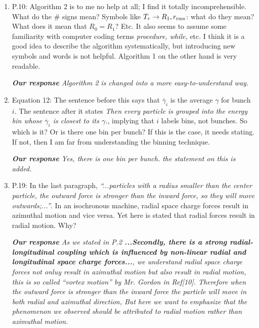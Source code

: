 \documentclass[10pt]{report}
\begin{document}
\begin{enumerate}
\item P.10: Algorithm 2 is to me no help at all; I find it totally
 incomprehensible. 
 What do the \# signs mean? Symbols like $T_r\rightarrow R_1,r_{\rm rms}$: what
 do they mean? What does it mean that $R_0=R_1$? Etc. It also seems to assume
 some familiarity with computer coding terms \textit{procedure, while,} etc. I
 think it is a good idea to describe the algorithm systematically, but
 introducing new symbols and words is not helpful. Algorithm 1 on the other hand
 is very readable.
 
 \vspace{+2mm}
 {\it {\bf Our response} Algorithm 2 is changed into a more easy-to-understand way.
 }
 \vspace{+2mm}

  \item Equation 12: The sentence before this says that $\overline{\gamma}_i$ is
 the 
 average $\gamma$ for bunch $i$. The sentence after it states \textit{Then every
 particle is grouped into the energy bin whose $\overline{\gamma}_i$ is closest
 to its $\gamma$.}, implying that $i$ labels bins, not bunches. So which is it?
 Or is there one bin per bunch? If this is the case, it needs stating. If not,
 then I am far from understanding the binning technique.

 
 \vspace{+2mm}
 {\it {\bf Our response}  Yes, there is one bin per bunch. the statement on this is added.
 }
 \vspace{+2mm}

 \item P.19: In the last paragraph, \textit{``...particles with a radius smaller
 than the center particle, the outward force is stronger than the inward force,
 so they will move outwards;...''}. In an isochronous machine, radial space
 charge forces result in azimuthal motion and vice versa. Yet here is stated
 that radial forces result in radial motion. Why?
 
 \vspace{+2mm}
 {\it {\bf Our response} As we stated in P.2 {\bf ...Secondly, there is a strong radial-longitudinal coupling which is influenced by non-linear radial and
longitudinal space charge forces...}, we understand radial space charge forces not onluy result in azimuthal motion but also result in radial motion, 
this is so called  ``vortex motion'' by Mr. Gordon in Ref[10]. Therefore when the outward force is stronger than the inward force the particle will move 
in both radial and azimuthal direction, But here we want to emphasize that the phenomenon we observed should be attributed to radial motion rather than azimuthal motion.   

 }
 \vspace{+2mm} 

 \end{enumerate}
\end{document}

